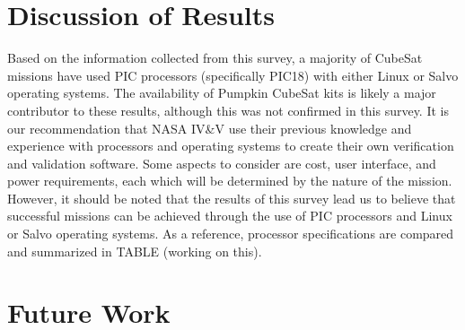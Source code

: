 \documentclass[11pt]{article}
\begin{document}
\section{Discussion of Results}
Based on the information collected from this survey, a majority of CubeSat missions have used PIC processors (specifically PIC18) with either Linux or Salvo operating systems.  The availability of Pumpkin CubeSat kits is likely a major contributor to these results, although this was not confirmed in this survey.  It is our recommendation that NASA IV\&V use their previous knowledge and experience with processors and operating systems to create their own verification and validation software.  Some aspects to consider are cost, user interface, and power requirements, each which will be determined by the nature of the mission.  However, it should be noted that the results of this survey lead us to believe that successful missions can be achieved through the use of PIC processors and Linux or Salvo operating systems.  As a reference, processor specifications are compared and summarized in TABLE (working on this).  

\section{Future Work}




\end{document}
